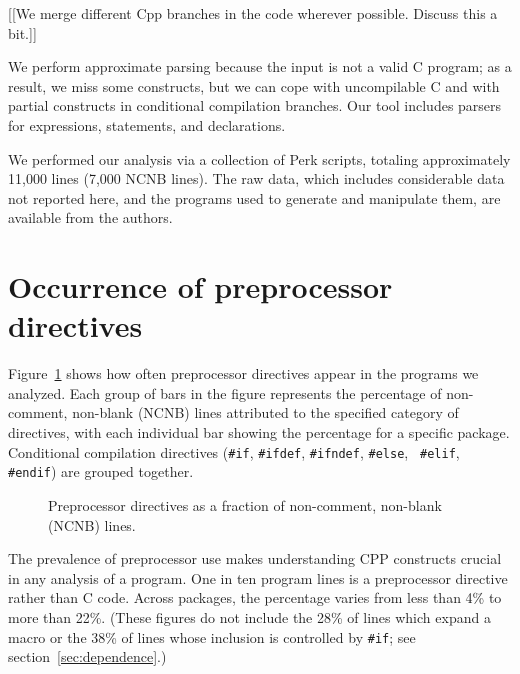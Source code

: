 \documentclass[10pt]{article}
\begin{document}
[[We merge different Cpp branches in the code wherever possible.  Discuss
this a bit.]]

We perform approximate parsing because the input is not a valid C program;
as a result, we miss some constructs, but we can cope with uncompilable C
and with partial constructs in conditional compilation branches.  Our tool
includes parsers for expressions, statements, and declarations.

We performed our analysis via a collection of Perk scripts, totaling
approximately 11,000 lines (7,000 NCNB lines).  The raw data, which
includes considerable data not reported here, and the programs used to
generate and manipulate them, are available from the authors.







\section{Occurrence of preprocessor directives}
\label{sec:directives}
\label{sec:first-content-section}

Figure~\ref{fig:directives-breakdown} shows how often preprocessor
directives appear in the programs we analyzed.  Each group of bars in the
figure represents the percentage of non-comment, non-blank (NCNB) lines
attributed to the specified category of directives, with each individual
bar showing the percentage for a specific package.  Conditional compilation
directives ({\tt \#if}, {\tt \#ifdef}, {\tt \#ifndef}, {\tt \#else}, {\tt
\#elif}, {\tt \#endif}) are grouped together.

\begin{figure}
\centerline{}
\caption{Preprocessor directives as a fraction of non-comment,
  non-blank (NCNB) lines.}
\label{fig:directives-breakdown}
\end{figure}

The prevalence of preprocessor use makes understanding CPP constructs
crucial in any analysis of a program.  One in ten program lines is a
preprocessor directive rather than C code.  Across
packages, the percentage varies from less than 4\% to more than 22\%.
(These figures do not include the 28\% of lines which expand a macro or the
38\% of lines whose inclusion is controlled by {\tt \#if}; see
section~\ref{sec:dependence}.)

\end{document}
